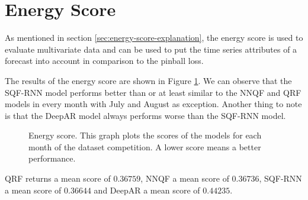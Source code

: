 \section{Energy Score}

As mentioned in section \ref{sec:energy-score-explanation}, the energy score is used to 
evaluate multivariate data and can be used to put 
the time series attributes of a forecast into account in comparison to the pinball loss.

The results of the energy score are shown in Figure \ref{fig:energy-score}. 
We can observe that the SQF-RNN model performs better than or at least similar 
to the NNQF and QRF models in every month with July and August as exception. 
Another thing to note is that the DeepAR model always performs worse than the SQF-RNN model. 

\begin{figure}[ht]
    \centering
    
    \caption[Energy score]{Energy score. 
    This graph plots the scores of the models for each month of the dataset competition. A lower score means a better performance.}
    \label{fig:energy-score}
\end{figure}

QRF returns a mean score of \(0.36759\), NNQF a mean score of \(0.36736\), 
SQF-RNN a mean score of \(0.36644\) and DeepAR a mean score of \(0.44235\).